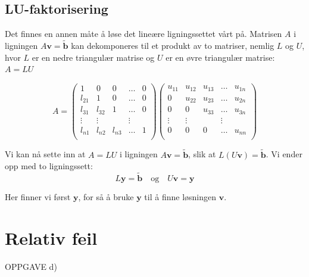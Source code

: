 \documentclass{article}
\begin{document}
\subsection{LU-faktorisering}
Det finnes en annen måte å løse det lineære ligningssettet vårt på. Matrisen $A$ i ligningen $A\textbf{v}=\tilde{\textbf{b}}$ kan dekomponeres til et produkt av to matriser, nemlig $L$ og $U$, hvor $L$ er en nedre triangulær matrise og $U$ er en øvre triangulær matrise: $A=LU$

\begin{equation}
 A = \left(\begin{array}{cccccc}
                          1 & 0 & 0 &\dots    & 0 \\
                           l_{21} & 1 & 0 &\dots &0 \\
                           l_{31} & l_{32} & 1 & \dots &0 \\
                          \vdots  & \vdots   &    &\vdots   \\
                           l_{n1 }& l_{n2}  & l_{n3}  &\dots  &1 \\                         
                      \end{array} \right) 
                      \left(\begin{array}{cccccc}
                          u_{11} & u_{12} & u_{13} &\dots  & u_{1n} \\
                           0 & u_{22} & u_{23} &\dots & u_{2n} \\
                           0 & 0 & u_{33} & \dots & u_{3n} \\
                          \vdots  & \vdots   &    &\vdots   \\
                           0 & 0   & 0  &\dots  & u_{nn} \\                         
                      \end{array} \right)
\end{equation}

Vi kan nå sette inn at $A=LU$ i ligningen $A\textbf{v}=\tilde{\textbf{b}}$, slik at $L(U\textbf{v}) = \tilde{\textbf{b}}$. Vi ender opp med to ligningssett:
\begin{equation}
L\textbf{y} = \tilde{\textbf{b}} \quad \textrm{og} \quad U\textbf{v} = \textbf{y}
\end{equation}

Her finner vi først $\textbf{y}$, for så å bruke $\textbf{y}$ til å finne løsningen $\textbf{v}$.


\section{Relativ feil}
OPPGAVE d)
\end{document}
